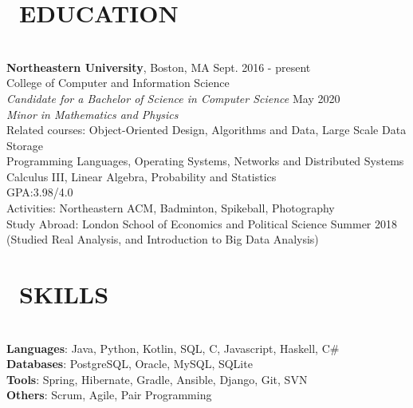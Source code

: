 \documentclass[11pt]{res}
\newcommand{\sectionunderline}{\vspace{-3mm}\hrulefill\\}
\newcommand{\listingtab}{\tabto{3.5cm}}
\newcommand{\newsect}[1]{\section{\Large \bf #1}}
\newcommand{\email}[1]{\faEnvelope\hspace{1mm} \href{mailto:#1}{#1}}
\newcommand{\phone}[1]{\faMobilePhone\hspace{1mm} #1}
\newcommand{\github}[1]{\faGit\hspace{1mm} \href{https://github.com/#1}{#1}}
\newcommand{\linkedin}[1]{\faLinkedinSquare\hspace{1mm} \href{https://linkedin.com/in/#1}{#1}}
\begin{document}
\address{
  \large\phone{(802) 503-5089}\:
  \large{$\bullet$}
  \large\email{derekpham67@gmail.com}\:
  \large{$\bullet$}
  \large\github{derekpham}\:
  \large{$\bullet$}
  \large\linkedin{derek-pham97}\\
  \normalsize Available: January - August 2019
}

\begin{resume}
  \newsect{\faGraduationCap\ EDUCATION}{
    \sectionunderline{
      {\bf Northeastern University}, Boston, MA \hfill Sept. 2016 - present\\
      College of Computer and Information Science}\\
                     {\it Candidate for a Bachelor of Science in Computer Science} \hfill May 2020\\
                     {\it Minor in Mathematics and Physics}\vspace{2mm}\\
                     Related courses:
                     \listingtab Object-Oriented Design, Algorithms and Data, Large Scale Data Storage\\
                     \listingtab Programming Languages, Operating Systems, Networks and Distributed Systems\\
                     \listingtab Calculus III, Linear Algebra, Probability and Statistics\\
                     GPA:\listingtab 3.98/4.0\\
                     Activities: \listingtab Northeastern ACM, Badminton, Spikeball, Photography\\
                     Study Abroad: \listingtab London School of Economics and Political Science \hfill Summer 2018\\
                     \listingtab (Studied Real Analysis, and Introduction to Big Data Analysis)
  }

  \newsect{\faCogs\ SKILLS}{
    \sectionunderline{
      {\bf Languages}: \listingtab Java, Python, Kotlin, SQL, C, Javascript, Haskell, C\#\\
      {\bf Databases}: \listingtab PostgreSQL, Oracle, MySQL, SQLite\\
      {\bf Tools}: \listingtab Spring, Hibernate, Gradle, Ansible, Django, Git, SVN\\
      {\bf Others}: \listingtab Scrum, Agile, Pair Programming
    }
  }


\end{resume}
\end{document}
